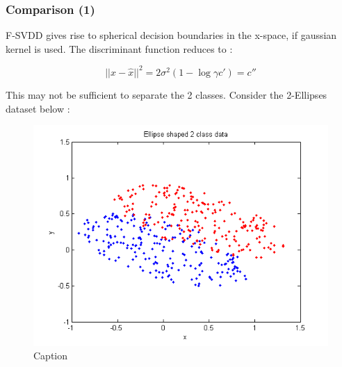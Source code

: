 \documentclass{beamer}
\begin{document}





\begin{frame}
\frametitle{Comparison (1)}
F-SVDD gives rise to spherical decision boundaries in the x-space, if gaussian kernel is used. 
The discriminant function reduces to :

\[ || x - \hat{x}||^2 = 2 \sigma^2 (1 - \log{\gamma c'}) = c''\] 

This may not be sufficient to separate the 2 classes. Consider the 2-Ellipses dataset below :



\begin{figure}
\centering
\includegraphics[scale=0.45]{data.png}
\caption{Caption}
\end{figure}




\end{frame}
\end{document}
